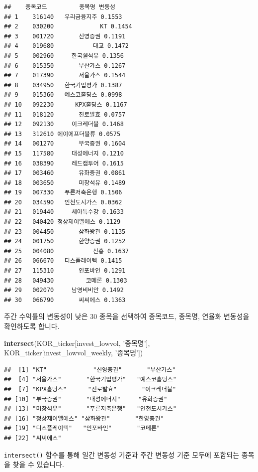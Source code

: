 \documentclass[12pt,]{book}
\newenvironment{Shaded}{\begin{snugshade}}{\end{snugshade}}
\newcommand{\KeywordTok}[1]{\textcolor[rgb]{0.13,0.29,0.53}{\textbf{#1}}}
\newcommand{\NormalTok}[1]{#1}
\newcommand{\StringTok}[1]{\textcolor[rgb]{0.31,0.60,0.02}{#1}}
\begin{document}
\begin{verbatim}
##    종목코드         종목명 변동성
## 1    316140   우리금융지주 0.1553
## 2    030200             KT 0.1454
## 3    001720       신영증권 0.1191
## 4    019680           대교 0.1472
## 5    002960     한국쉘석유 0.1356
## 6    015350       부산가스 0.1267
## 7    017390       서울가스 0.1544
## 8    034950   한국기업평가 0.1387
## 9    015360   예스코홀딩스 0.0998
## 10   092230      KPX홀딩스 0.1167
## 11   018120       진로발효 0.0757
## 12   092130     이크레더블 0.1468
## 13   312610 에이에프더블류 0.0575
## 14   001270       부국증권 0.1604
## 15   117580     대성에너지 0.1210
## 16   038390     레드캡투어 0.1615
## 17   003460       유화증권 0.0861
## 18   003650       미창석유 0.1489
## 19   007330   푸른저축은행 0.1506
## 20   034590   인천도시가스 0.0362
## 21   019440     세아특수강 0.1633
## 22   040420 정상제이엘에스 0.1129
## 23   004450       삼화왕관 0.1135
## 24   001750       한양증권 0.1252
## 25   004080           신흥 0.1637
## 26   066670   디스플레이텍 0.1415
## 27   115310       인포바인 0.1291
## 28   049430         코메론 0.1303
## 29   002070     남영비비안 0.1492
## 30   066790       씨씨에스 0.1363
\end{verbatim}

주간 수익률의 변동성이 낮은 30 종목을 선택하여 종목코드, 종목명, 연율화 변동성을 확인하도록 합니다.

\begin{Shaded}
\begin{Highlighting}[]
\KeywordTok{intersect}\NormalTok{(KOR_ticker[invest_lowvol, }\StringTok{'종목명'}\NormalTok{],}
\NormalTok{          KOR_ticker[invest_lowvol_weekly, }\StringTok{'종목명'}\NormalTok{])}
\end{Highlighting}
\end{Shaded}

\begin{verbatim}
##  [1] "KT"             "신영증권"       "부산가스"      
##  [4] "서울가스"       "한국기업평가"   "예스코홀딩스"  
##  [7] "KPX홀딩스"      "진로발효"       "이크레더블"    
## [10] "부국증권"       "대성에너지"     "유화증권"      
## [13] "미창석유"       "푸른저축은행"   "인천도시가스"  
## [16] "정상제이엘에스" "삼화왕관"       "한양증권"      
## [19] "디스플레이텍"   "인포바인"       "코메론"        
## [22] "씨씨에스"
\end{verbatim}

\texttt{intersect()} 함수를 통해 일간 변동성 기준과 주간 변동성 기준 모두에 포함되는 종목을 찾을 수 있습니다.
\end{document}
